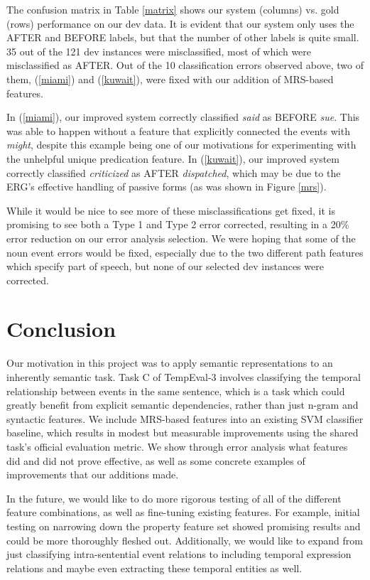 \documentclass[11pt]{article}
\begin{document}
The confusion matrix in Table \ref{matrix} shows our system (columns) vs. gold (rows) performance on our dev data. It is evident that our system only uses the AFTER and BEFORE labels, but that the number of other labels is quite small. 35 out of the 121 dev instances were misclassified, most of which were misclassified as AFTER. Out of the 10 classification errors observed above, two of them, (\ref{miami}) and (\ref{kuwait}), were fixed with our addition of MRS-based features.

In (\ref{miami}), our improved system correctly classified \emph{said} as BEFORE \emph{sue}. This was able to happen without a feature that explicitly connected the events with \emph{might}, despite this example being one of our motivations for experimenting with the unhelpful unique predication feature. In (\ref{kuwait}), our improved system correctly classified \emph{criticized} as AFTER \emph{dispatched}, which may be due to the ERG's effective handling of passive forms (as was shown in Figure \ref{mrs}).

While it would be nice to see more of these misclassifications get fixed, it is promising to see both a Type 1 and Type 2 error corrected, resulting in a 20\% error reduction on our error analysis selection. We were hoping that some of the noun event errors would be fixed, especially due to the two different path features which specify part of speech, but none of our selected dev instances were corrected.

\section{Conclusion}
\label{conclusion}

Our motivation in this project was to apply semantic representations to an inherently semantic task. Task C of TempEval-3 involves classifying the temporal relationship between events in the same sentence, which is a task which could greatly benefit from explicit semantic dependencies, rather than just n-gram and syntactic features. We include MRS-based features into an existing SVM classifier baseline, which results in modest but measurable improvements using the shared task's official evaluation metric. We show through error analysis what features did and did not prove effective, as well as some concrete examples of improvements that our additions made.

In the future, we would like to do more rigorous testing of all of the different feature combinations, as well as fine-tuning existing features. For example, initial testing on narrowing down the property feature set showed promising results and could be more thoroughly fleshed out. Additionally, we would like to expand from just classifying intra-sentential event relations to including temporal expression relations and maybe even extracting these temporal entities as well.
\end{document}
